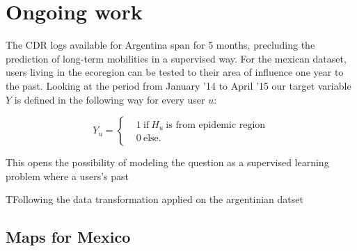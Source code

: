 \section{Ongoing work}

The CDR logs available for Argentina span for 5 months, precluding the prediction of long-term mobilities in a supervised way. For the mexican dataset, users living in the ecoregion can be tested to their area of influence one year to the past. Looking at the period from January '14 to April '15 our target variable $Y $ is defined in the following way for every user $u$: 

\[
    Y_u =
      \begin{cases}
        &1 \ \mbox{if} \ H_u \ \mbox{is from epidemic region}\\
        &0 \ \mbox{else}.
      \end{cases}
    \]


This opens the possibility of modeling the question as a supervised learning problem where a users's past 

TFollowing the data transformation applied on the argentinian datset

\subsection{Maps for Mexico}